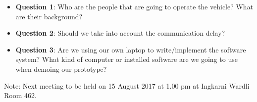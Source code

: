 \documentclass[11pt, a4paper]{article}
\begin{document}
\begin{itemize}

\item[] \textbf{Question 1}: Who are the people that are going to operate the vehicle? What are their background?

\item[] \textbf{Question 2}: Should we take into account the communication delay?

\item[] \textbf{Question 3}: Are we using our own laptop to write/implement the software system? What kind of computer or installed software are we going to use when demoing our prototype?

\end{itemize} 

\vspace*{10pt}
\noindent Note: Next meeting to be held on 15 August 2017 at 1.00 pm at Ingkarni Wardli Room 462.
\end{document}
